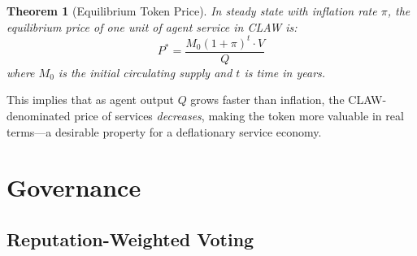 \documentclass{article}
\newtheorem{theorem}{Theorem}
\begin{document}
\begin{theorem}[Equilibrium Token Price]\label{thm:price}
In steady state with inflation rate $\pi$, the equilibrium price of one unit of agent service in CLAW is:
\begin{equation}
    P^* = \frac{M_0 (1 + \pi)^t \cdot V}{Q}
\end{equation}
where $M_0$ is the initial circulating supply and $t$ is time in years.
\end{theorem}

This implies that as agent output $Q$ grows faster than inflation, the CLAW-denominated price of services \textit{decreases}, making the token more valuable in real terms---a desirable property for a deflationary service economy.


\section{Governance}\label{sec:governance}

\subsection{Reputation-Weighted Voting}
\end{document}
